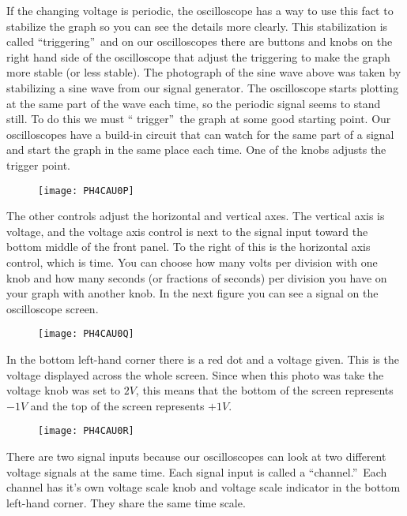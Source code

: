 If the changing voltage is periodic, the oscilloscope has a way to use this
fact to stabilize the graph so you can see the details more clearly. This
stabilization is called \textquotedblleft triggering\textquotedblright\ and
on our oscilloscopes there are buttons and knobs on the right hand side of
the oscilloscope that adjust the triggering to make the graph more stable
(or less stable). The photograph of the sine wave above was taken by
stabilizing a sine wave from our signal generator. The oscilloscope starts
plotting at the same part of the wave each time, so the periodic signal
seems to stand still. To do this we must \textquotedblleft
trigger\textquotedblright\ the graph at some good starting point. Our
oscilloscopes have a build-in circuit that can watch for the same part of a
signal and start the graph in the same place each time. One of the knobs
adjusts the trigger point. \begin{figure}[h!]
\texttt{[image: PH4CAU0P]}
\end{figure}The other controls adjust the
horizontal and vertical axes. The vertical axis is voltage, and the voltage
axis control is next to the signal input toward the bottom middle of the
front panel. To the right of this is the horizontal axis control, which is
time. You can choose how many volts per division with one knob and how many
seconds (or fractions of seconds) per division you have on your graph with
another knob. In the next figure you can see a signal on the oscilloscope
screen. \begin{figure}[h!]
\texttt{[image: PH4CAU0Q]}
\end{figure}In the bottom left-hand corner
there is a red dot and a voltage given. This is the voltage displayed across
the whole screen. Since when this photo was take the voltage knob was set to 
$2\unit{V}$, this means that the bottom of the screen represents $-1\unit{V}$
and the top of the screen represents $+1\unit{V}.$ \begin{figure}[h!]
\texttt{[image: PH4CAU0R]}
\end{figure}

There are two signal inputs because our oscilloscopes can look at two
different voltage signals at the same time. Each signal input is called a
\textquotedblleft channel.\textquotedblright\ Each channel has it's own
voltage scale knob and voltage scale indicator in the bottom left-hand
corner. They share the same time scale.

